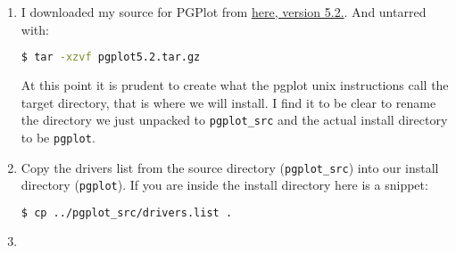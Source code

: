 \documentclass{article}
\begin{document}
    	\begin{enumerate}
    	\item \noindent I downloaded my source for PGPlot from \href{ftp://ftp.astro.caltech.edu/pub/pgplot/pgplot5.2.tar.gz}{here, version 5.2.}. And untarred with: 
    	\begin{lstlisting}[language=bash]
    	$ tar -xzvf pgplot5.2.tar.gz
    	\end{lstlisting}
    	 At this point it is prudent to create what the pgplot unix instructions call the target directory, that is where we will install. I find it to be clear to rename the directory we just unpacked to \texttt{pgplot\_src} and the actual install directory to be \texttt{pgplot}. 
    	\item Copy the drivers list from the source directory (\texttt{pgplot\_src}) into our install directory (\texttt{pgplot}). If you are inside the install directory here is a snippet: \noindent
    	\begin{lstlisting}[language=bash]
    	$ cp ../pgplot_src/drivers.list .
    	\end{lstlisting} 
    	\item 
    	\end{enumerate}
    	


    	
\end{document}
